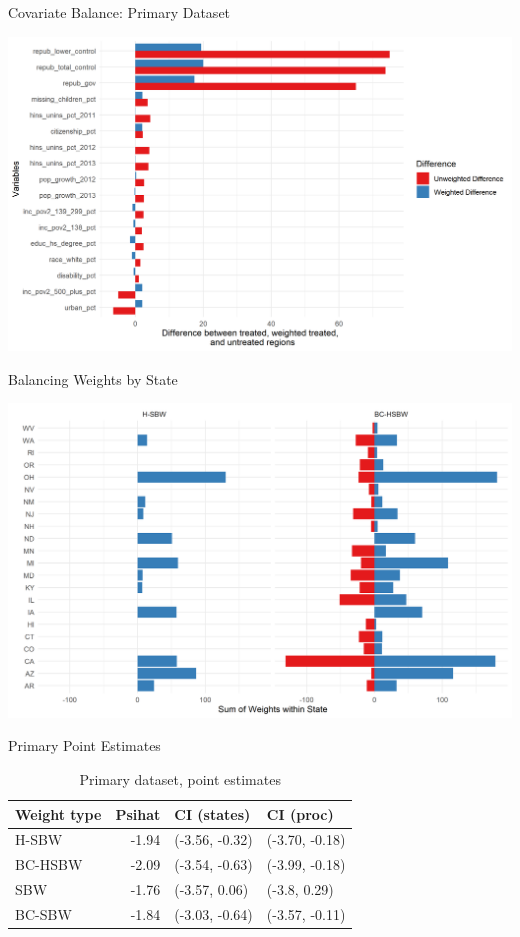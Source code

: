 \documentclass[hyperref={pdfpagelabels=false}]{beamer}
\begin{document}
\begin{frame}{Covariate Balance: Primary Dataset}
    \begin{center}
	\includegraphics[scale=0.5]{01_Plots/balance-plot-etuc1.png}
    \end{center}
\end{frame}

\begin{frame}{Balancing Weights by State}
    \begin{center}
	\includegraphics[scale=0.5]{01_Plots/weights-by-state-hsbw-c1.png}
    \end{center}
\end{frame}

\begin{frame}{Primary Point Estimates}

\begin{table}[ht]
\begin{tabular}{lrll}
  \toprule
Weight type & Psihat & CI (states) & CI (proc) \\ 
  \midrule
H-SBW & -1.94 & (-3.56, -0.32) & (-3.70, -0.18) \\ 
  BC-HSBW & -2.09 & (-3.54, -0.63) & (-3.99, -0.18) \\ 
  SBW & -1.76 & (-3.57, 0.06) & (-3.8, 0.29) \\ 
  BC-SBW & -1.84 & (-3.03, -0.64) & (-3.57, -0.11) \\ 
   \bottomrule
\end{tabular}
\caption{Primary dataset, point estimates}
\end{table}
\end{frame}
\end{document}
